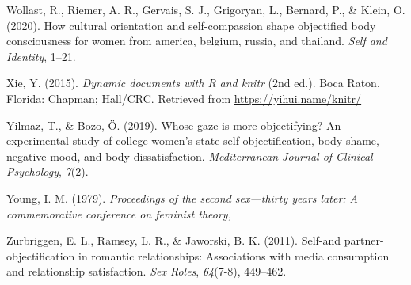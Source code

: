 \documentclass[
  man]{apa6}
\begin{document}
\leavevmode\hypertarget{ref-wollast2020cultural}{}%
Wollast, R., Riemer, A. R., Gervais, S. J., Grigoryan, L., Bernard, P., \& Klein, O. (2020). How cultural orientation and self-compassion shape objectified body consciousness for women from america, belgium, russia, and thailand. \emph{Self and Identity}, 1--21.

\leavevmode\hypertarget{ref-R-knitr}{}%
Xie, Y. (2015). \emph{Dynamic documents with R and knitr} (2nd ed.). Boca Raton, Florida: Chapman; Hall/CRC. Retrieved from \url{https://yihui.name/knitr/}

\leavevmode\hypertarget{ref-yilmaz2019whose}{}%
Yilmaz, T., \& Bozo, Ö. (2019). Whose gaze is more objectifying? An experimental study of college women's state self-objectification, body shame, negative mood, and body dissatisfaction. \emph{Mediterranean Journal of Clinical Psychology}, \emph{7}(2).

\leavevmode\hypertarget{ref-young1979}{}%
Young, I. M. (1979). \emph{Proceedings of the second sex---thirty years later: A commemorative conference on feminist theory,}

\leavevmode\hypertarget{ref-zurbriggen2011self}{}%
Zurbriggen, E. L., Ramsey, L. R., \& Jaworski, B. K. (2011). Self-and partner-objectification in romantic relationships: Associations with media consumption and relationship satisfaction. \emph{Sex Roles}, \emph{64}(7-8), 449--462.

\endgroup
\end{document}

